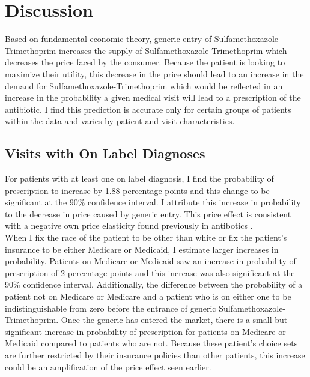 \chapter{Discussion}
Based on fundamental economic theory, generic entry of Sulfamethoxazole-Trimethoprim increases the supply of Sulfamethoxazole-Trimethoprim which decreases the price faced by the consumer. Because the patient is looking to maximize their utility, this decrease in the price should lead to an increase in the demand for Sulfamethoxazole-Trimethoprim which would be reflected in an increase in the probability a given medical visit will lead to a prescription of the antibiotic. I find this prediction is accurate only for certain groups of patients within the data and varies by patient and visit characteristics.\\
\section{Visits with On Label Diagnoses}
\indent For patients with at least one on label diagnosis, I find the probability of prescription to increase by 1.88 percentage points and this change to be significant at the 90\% confidence interval. I attribute this increase in probability to the decrease in price caused by generic entry. This price effect is consistent with a negative own price elasticity found previously in antibotics \cite{kaier_impact_2013}.\\
\indent When I fix the race of the patient to be other than white or fix the patient's insurance to be either Medicare or Medicaid, I estimate larger increases in probability. Patients on Medicare or Medicaid saw an increase in probability of prescription of 2 percentage points and this increase was also significant at the 90\% confidence interval. Additionally, the difference between the probability of a patient not on Medicare or Medicare and a patient who is on either one to be indistinguishable from zero before the entrance of generic Sulfamethoxazole-Trimethoprim. Once the generic has entered the market, there is a small but significant increase in probability of prescription for patients on Medicare or Medicaid compared to patients who are not. Because these patient's choice sets are further restricted by their insurance policies than other patients, this increase could be an amplification of the price effect seen earlier.\\
